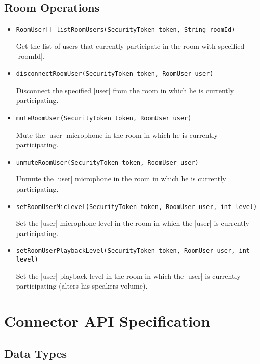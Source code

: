 \documentclass[a4paper]{report}
\newenvironment{Api}{\begin{itemize}}{\end{itemize}}
\newcommand{\ApiCode}[1]{\lstinline[style=styleApi]|#1|}
\newcommand{\ApiItem}[1]{\item #1 %

}
\newcommand{\ApiCmd}[1]{\ApiItem{\ApiCode{#1}}}
\newcommand{\ApiClass}[2]{\ApiItem{%
  \ifx&#2& \ApiCode{class #1} \else \ApiCode{class #1 extends #2} \fi}%
}
\newenvironment{ApiClassAttributes}{%

\begin{samepage}\textbf{Attributes:}\begin{compactitem}}{\end{compactitem}\end{samepage}}
\newcommand{\ApiRequired}{{\color{blue!50!black}\textbf{Required}}}
\newcommand{\ApiReadOnly}{{\color{red!50!black}\textbf{ReadOnly}}}
\newcommand{\ApiClassAttribute}[3]{\ApiItem{\ApiCode{#2} \ApiCode{#1} \hspace{1mm}(\ifx&#3&\ApiReadOnly\else#3\fi)
}}
\begin{document}
\section{Room Operations}

\begin{Api}

\ApiCmd{RoomUser[] listRoomUsers(SecurityToken token, String roomId)}
Get the list of users that currently participate in the room with specified |roomId|.

\ApiCmd{disconnectRoomUser(SecurityToken token, RoomUser user)}
Disconnect the specified |user| from the room in which he is currently participating.

\ApiCmd{muteRoomUser(SecurityToken token, RoomUser user)}
Mute the |user| microphone in the room in which he is currently participating.

\ApiCmd{unmuteRoomUser(SecurityToken token, RoomUser user)}
Unmute the |user| microphone in the room in which he is currently participating.

\ApiCmd{setRoomUserMicLevel(SecurityToken token, RoomUser user, int level)}
Set the |user| microphone level in the room in which the |user| is currently participating.

\ApiCmd{setRoomUserPlaybackLevel(SecurityToken token, RoomUser user, int level)}
Set the |user| playback level in the room in which the |user| is currently participating (alters his speakers volume).

\end{Api}


\chapter{Connector API Specification}

\section{Data Types}



\end{document}

